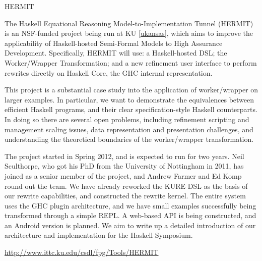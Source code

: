 \begin{hcarentry}{HERMIT}
\label{HERMIT}
\makeheader

The Haskell Equational Reasoning Model-to-Implementation Tunnel
(HERMIT) is an NSF-funded project being run at KU \cref{ukansas}, which aims to improve the
applicability of Haskell-hosted Semi-Formal Models to High Assurance Development.
Specifically, HERMIT will use: a Haskell-hosted DSL; the Worker/Wrapper Transformation;
and a new refinement user interface to perform rewrites directly on Haskell Core, the GHC internal representation.

This project is a substantial case study into the application of
worker/wrapper on larger examples. In particular, we want to
demonstrate the equivalences between efficient Haskell programs, and
their clear specification-style Haskell counterparts. In doing so
there are several open problems, including refinement scripting and
management scaling issues, data representation and presentation
challenges, and understanding the theoretical boundaries of the
worker/wrapper transformation.

The project started in Spring 2012, and is expected to run for two years.
Neil Sculthorpe, who got his PhD from the University of Nottingham in 2011, has joined as a senior member of the project,
and Andrew Farmer and Ed Komp round out the team.
We have already reworked the KURE DSL as the basis of our rewrite capabilities, and constructed the rewrite kernel.
The entire system uses the GHC plugin architecture,
and we have small examples successfully being transformed through a simple REPL.
A web-based API is being constructed, and an Android version is planned.
We aim to write up a detailed introduction of our architecture
and implementation for the Haskell Symposium.

\FurtherReading
  \url{http://www.ittc.ku.edu/csdl/fpg/Tools/HERMIT}
\end{hcarentry}
